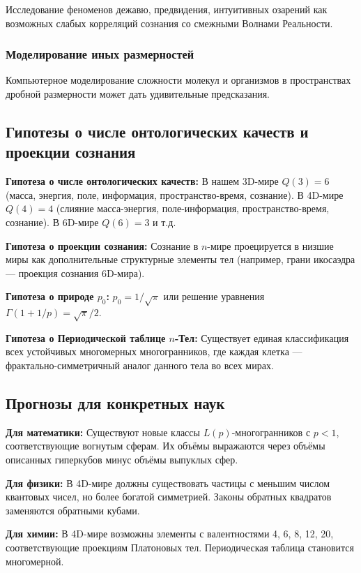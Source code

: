 \documentclass[a4paper,12pt]{article}
\begin{document}
Исследование феноменов дежавю, предвидения, интуитивных озарений как возможных слабых корреляций сознания со смежными Волнами Реальности.

\subsubsection{Моделирование иных размерностей}

Компьютерное моделирование сложности молекул и организмов в пространствах дробной размерности может дать удивительные предсказания.

\subsection{Гипотезы о числе онтологических качеств и проекции сознания}

\textbf{Гипотеза о числе онтологических качеств:} В нашем 3D-мире $Q(3) = 6$ (масса, энергия, поле, информация, пространство-время, сознание). В 4D-мире $Q(4) = 4$ (слияние масса-энергия, поле-информация, пространство-время, сознание). В 6D-мире $Q(6) = 3$ и т.д.

\textbf{Гипотеза о проекции сознания:} Сознание в $n$-мире проецируется в низшие миры как дополнительные структурные элементы тел (например, грани икосаэдра — проекция сознания 6D-мира).

\textbf{Гипотеза о природе $p_0$:} $p_0 = 1/\sqrt{\pi}$ или решение уравнения $\Gamma(1+1/p) = \sqrt{\pi}/2$.

\textbf{Гипотеза о Периодической таблице $n$-Тел:} Существует единая классификация всех устойчивых многомерных многогранников, где каждая клетка — фрактально-симметричный аналог данного тела во всех мирах.

\subsection{Прогнозы для конкретных наук}

\textbf{Для математики:} Существуют новые классы $L(p)$-многогранников с $p < 1$, соответствующие вогнутым сферам. Их объёмы выражаются через объёмы описанных гиперкубов минус объёмы выпуклых сфер.

\textbf{Для физики:} В 4D-мире должны существовать частицы с меньшим числом квантовых чисел, но более богатой симметрией. Законы обратных квадратов заменяются обратными кубами.

\textbf{Для химии:} В 4D-мире возможны элементы с валентностями 4, 6, 8, 12, 20, соответствующие проекциям Платоновых тел. Периодическая таблица становится многомерной.
\end{document}
